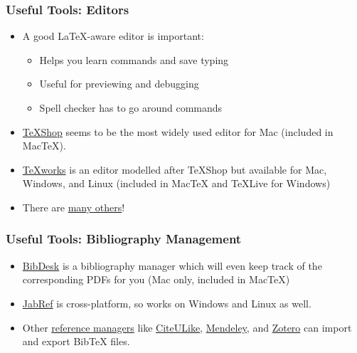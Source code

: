 \begin{frame}
\frametitle{Useful Tools: Editors}

\begin{itemize}
\item A good \LaTeX-aware editor is important:
\begin{itemize}
\item Helps you learn commands and save typing
\item Useful for previewing and debugging
\item Spell checker has to go around commands
\end{itemize}
\item \href{http://pages.uoregon.edu/koch/texshop/texshop.html}{TeXShop}
 seems to be the most widely used editor for Mac (included in MacTeX).
\item \href{http://www.tug.org/texworks/}{TeXworks} is an editor 
modelled after TeXShop but available for Mac, Windows, and Linux 
(included in MacTeX and TeXLive for Windows)
\item There are
  \href{http://en.wikipedia.org/wiki/Comparison_of_TeX_editors}{many
    others}!
\end{itemize}

\end{frame}

\begin{frame}
\frametitle{Useful Tools: Bibliography Management}

\begin{itemize}
\item \href{http://bibdesk.sourceforge.net/}{BibDesk} is a
  bibliography manager which will even keep track of the corresponding
  PDFs for you (Mac only, included in MacTeX)
\item \href{http://jabref.sourceforge.net/}{JabRef} is cross-platform,
  so works on Windows and Linux as well.
\item Other
  \href{http://en.wikipedia.org/wiki/Comparison_of_reference_management_software}{reference
    managers} like \href{http://www.citeulike.org/}{CiteULike},
  \href{http://www.mendeley.com/}{Mendeley}, and
  \href{http://www.zotero.org/}{Zotero} can import and export
  Bib\TeX{} files.
\end{itemize}

\end{frame}

